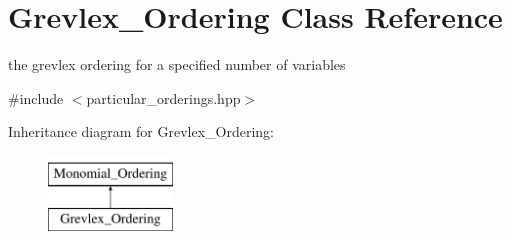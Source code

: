 \hypertarget{class_grevlex___ordering}{}\section{Grevlex\+\_\+\+Ordering Class Reference}
\label{class_grevlex___ordering}


the grevlex ordering for a specified number of variables  




{\ttfamily \#include $<$particular\+\_\+orderings.\+hpp$>$}

Inheritance diagram for Grevlex\+\_\+\+Ordering\+:\begin{figure}[H]
\begin{center}
\leavevmode
\includegraphics[height=2.000000cm]{class_grevlex___ordering}
\end{center}
\end{figure}
